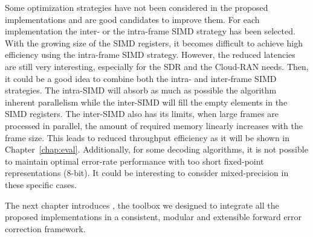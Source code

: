 Some optimization strategies have not been considered in the proposed
implementations and are good candidates to improve them. For each implementation
the inter- or the intra-frame SIMD strategy has been selected. With the growing
size of the SIMD registers, it becomes difficult to achieve high efficiency
using the intra-frame SIMD strategy. However, the reduced latencies are still
very interesting, especially for the SDR and the Cloud-RAN needs. Then, it could
be a good idea to combine both the intra- and inter-frame SIMD strategies. The
intra-SIMD will absorb as much as possible the algorithm inherent parallelism
while the inter-SIMD will fill the empty elements in the SIMD registers. The
inter-SIMD also has its limits, when large frames are processed in parallel, the
amount of required memory linearly increases with the frame size. This leads to
reduced throughput efficiency as it will be shown in Chapter~\ref{chap:eval}.
Additionally, for some decoding algorithms, it is not possible to maintain
optimal error-rate performance with too short fixed-point representations
(8-bit). It could be interesting to consider mixed-precision in these specific
cases.

The next chapter introduces \AFFECT, the toolbox we designed to integrate all
the proposed implementations in a consistent, modular and extensible forward
error correction framework.
